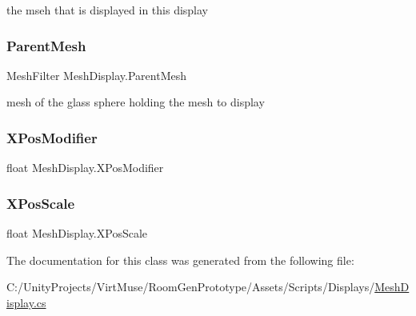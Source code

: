 the mseh that is displayed in this display 

\mbox{\label{class_mesh_display_a112cd7fd6e19ed52906cbb4240dc6735}} 
\subsubsection{\texorpdfstring{Parent\+Mesh}{ParentMesh}}
{\footnotesize\ttfamily Mesh\+Filter Mesh\+Display.\+Parent\+Mesh}



mesh of the glass sphere holding the mesh to display 

\mbox{\label{class_mesh_display_a6b33d912f5f2abd389f3feb3af1ce621}} 
\subsubsection{\texorpdfstring{X\+Pos\+Modifier}{XPosModifier}}
{\footnotesize\ttfamily float Mesh\+Display.\+X\+Pos\+Modifier\hspace{0.3cm}{\ttfamily [static]}}

\mbox{\label{class_mesh_display_a13c5ad03c68d0b4519bfb8ca23ac6f11}} 
\subsubsection{\texorpdfstring{X\+Pos\+Scale}{XPosScale}}
{\footnotesize\ttfamily float Mesh\+Display.\+X\+Pos\+Scale\hspace{0.3cm}{\ttfamily [static]}}



The documentation for this class was generated from the following file\+:\begin{DoxyCompactItemize}
\item 
C\+:/\+Unity\+Projects/\+Virt\+Muse/\+Room\+Gen\+Prototype/\+Assets/\+Scripts/\+Displays/\mbox{\hyperlink{_mesh_display_8cs}{Mesh\+Display.\+cs}}\end{DoxyCompactItemize}
